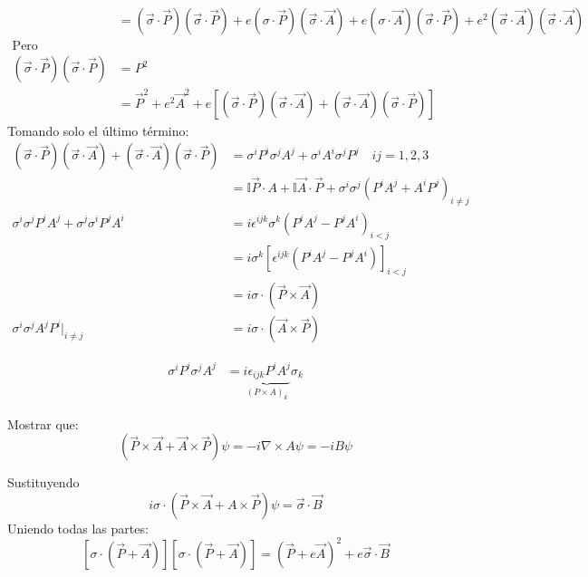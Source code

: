 \documentclass[a4paper,12pt]{article}
\begin{document}
\begin{align*}
[\sigma\cdot (\vec P +e \vec A )][\sigma\cdot (\vec P +e \vec A )]&= ( \vec \sigma\cdot \vec P)( \vec \sigma\cdot \vec P)+ e(\sigma\cdot \vec P)( \vec \sigma\cdot \vec A) +e(   \sigma\cdot \vec A)( \vec \sigma\cdot \vec P) +e^2( \vec \sigma\cdot \vec A)( \vec \sigma\cdot \vec A) \\
\text{Pero} \\
( \vec \sigma\cdot \vec P)( \vec \sigma\cdot \vec P)&= P^2\\
&= \vec P^2 +e^2 \vec A^2+e [( \vec \sigma\cdot \vec P)( \vec \sigma\cdot \vec A) +( \vec \sigma\cdot \vec A) ( \vec \sigma\cdot \vec P)  ] 
\end{align*}
Tomando solo el último término:
\begin{align*}
( \vec \sigma\cdot \vec P)( \vec \sigma\cdot \vec A) +( \vec \sigma\cdot \vec A)( \vec \sigma\cdot \vec P) &= \sigma^i P^i\sigma^j A^j+\sigma^i A^i\sigma^j P^j \quad ij =1,2,3 \\
&= \mathbb{I} \vec P \cdot A+ \mathbb{I} \vec A \cdot \vec P  + \sigma^i\sigma^j(P^i A ^j+A^i P^j)_{i \not =j}\\
\sigma^i\sigma^jP^iA^j+\sigma^j\sigma^i P^j A^i &= i \epsilon^{ijk} \sigma^k (P ^iA^j-P^j A^i )_{i<j}\\
&= i \sigma^k [\epsilon^{ijk} (P^i A^j-P^j A^i) ]_{i<j} \\
&= i\sigma \cdot (\vec P \times \vec A) \\
\sigma^i\sigma^j A^jP^i\Big |_{i \not = j}&=i \sigma\cdot (\vec A\times \vec P)
\end{align*}

\begin{align*}
    \sigma^iP ^i\sigma^jA^j&=\underbrace{i \epsilon_{ijk} P^iA^j}_{(P\times A)_k } \sigma_k
\end{align*}
\begin{tarea}
    Mostrar que: 
    \[
    (\vec P \times \vec A  +\vec A \times \vec P ) \psi = -i \nabla \times A \psi = -i B \psi 
    \]
\end{tarea}

Sustituyendo
\[
i \sigma \cdot (\vec P \times \vec A  + A \times \vec P ) \psi = \vec \sigma \cdot \vec B
\]
Uniendo todas las partes: 
\[
[\sigma \cdot  (\vec P +\vec A) ] [\sigma\cdot (\vec P + \vec A  )]= (\vec P +e \vec A )^2 +e\vec \sigma \cdot \vec B
\]
\end{document}
